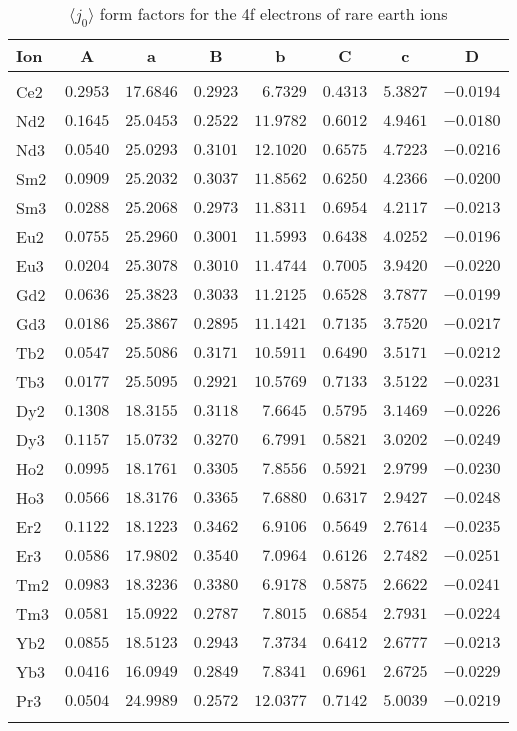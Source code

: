 \begin{table}[H]
\caption{$\langle j_0\rangle$ form factors for the 4f electrons of rare earth ions}
\label{re4fj0}
{\tablesize
\begin{tabular}{lrrrrrrr}
\hline
Ion&
\multicolumn{1}{c}{A}&\multicolumn{1}{c}{a}&
\multicolumn{1}{c}{B}&\multicolumn{1}{c}{b}&
\multicolumn{1}{c}{C}&\multicolumn{1}{c}{c}&\multicolumn{1}{c}{D}\\
\hline\\[-2ex]
Ce2 &$0.2953$ &$17.6846$ &$0.2923$ &$6.7329$ &$0.4313$ &$5.3827$ &$-0.0194$ \\
Nd2 &$0.1645$ &$25.0453$ &$0.2522$ &$11.9782$ &$0.6012$ &$4.9461$ &$-0.0180$ \\
Nd3 &$0.0540$ &$25.0293$ &$0.3101$ &$12.1020$ &$0.6575$ &$4.7223$ &$-0.0216$ \\
Sm2 &$0.0909$ &$25.2032$ &$0.3037$ &$11.8562$ &$0.6250$ &$4.2366$ &$-0.0200$ \\
Sm3 &$0.0288$ &$25.2068$ &$0.2973$ &$11.8311$ &$0.6954$ &$4.2117$ &$-0.0213$ \\
Eu2 &$0.0755$ &$25.2960$ &$0.3001$ &$11.5993$ &$0.6438$ &$4.0252$ &$-0.0196$ \\
Eu3 &$0.0204$ &$25.3078$ &$0.3010$ &$11.4744$ &$0.7005$ &$3.9420$ &$-0.0220$ \\
Gd2 &$0.0636$ &$25.3823$ &$0.3033$ &$11.2125$ &$0.6528$ &$3.7877$ &$-0.0199$ \\
Gd3 &$0.0186$ &$25.3867$ &$0.2895$ &$11.1421$ &$0.7135$ &$3.7520$ &$-0.0217$ \\
Tb2 &$0.0547$ &$25.5086$ &$0.3171$ &$10.5911$ &$0.6490$ &$3.5171$ &$-0.0212$ \\
Tb3 &$0.0177$ &$25.5095$ &$0.2921$ &$10.5769$ &$0.7133$ &$3.5122$ &$-0.0231$ \\
Dy2 &$0.1308$ &$18.3155$ &$0.3118$ &$7.6645$ &$0.5795$ &$3.1469$ &$-0.0226$ \\
Dy3 &$0.1157$ &$15.0732$ &$0.3270$ &$6.7991$ &$0.5821$ &$3.0202$ &$-0.0249$ \\
Ho2 &$0.0995$ &$18.1761$ &$0.3305$ &$7.8556$ &$0.5921$ &$2.9799$ &$-0.0230$ \\
Ho3 &$0.0566$ &$18.3176$ &$0.3365$ &$7.6880$ &$0.6317$ &$2.9427$ &$-0.0248$ \\
Er2 &$0.1122$ &$18.1223$ &$0.3462$ &$6.9106$ &$0.5649$ &$2.7614$ &$-0.0235$ \\
Er3 &$0.0586$ &$17.9802$ &$0.3540$ &$7.0964$ &$0.6126$ &$2.7482$ &$-0.0251$ \\
Tm2 &$0.0983$ &$18.3236$ &$0.3380$ &$6.9178$ &$0.5875$ &$2.6622$ &$-0.0241$ \\
Tm3 &$0.0581$ &$15.0922$ &$0.2787$ &$7.8015$ &$0.6854$ &$2.7931$ &$-0.0224$ \\
Yb2 &$0.0855$ &$18.5123$ &$0.2943$ &$7.3734$ &$0.6412$ &$2.6777$ &$-0.0213$ \\
Yb3 &$0.0416$ &$16.0949$ &$0.2849$ &$7.8341$ &$0.6961$ &$2.6725$ &$-0.0229$ \\
Pr3 &$0.0504$ &$24.9989$ &$0.2572$ &$12.0377$ &$0.7142$ &$5.0039$ &$-0.0219$ \\
\hline\\[-2ex]
\end{tabular}
}
\vspace{2mm}
\end{table}
